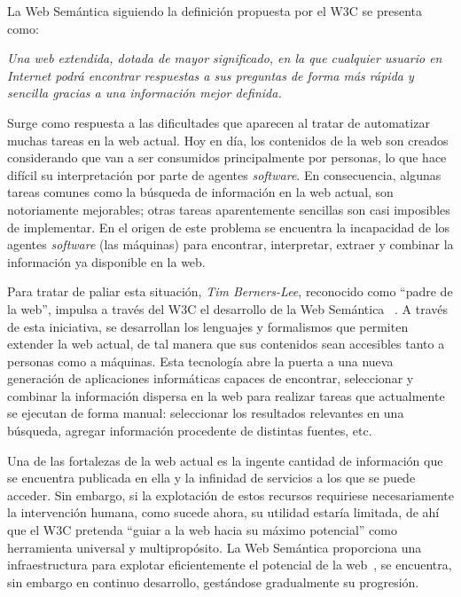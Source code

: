La Web Semántica siguiendo la definición propuesta por el W3C se presenta como: 
\begin{Frame}
\textit{Una web extendida, dotada de mayor significado, en la que cualquier
usuario en Internet podrá encontrar respuestas a sus preguntas de forma más rápida y
sencilla gracias a una información mejor definida.}
\end{Frame}

Surge como respuesta a las dificultades que aparecen al tratar de 
automatizar muchas tareas en la web actual. Hoy en día, los contenidos de la web son
creados considerando que van a ser consumidos principalmente por personas,
lo que hace difícil su interpretación por parte de agentes \textit{software}.
En consecuencia, algunas tareas comunes como la búsqueda de información en la web actual,
son notoriamente mejorables; otras tareas aparentemente sencillas son casi imposibles de implementar.
En el origen de este problema se encuentra la incapacidad de los agentes \textit{software} (las máquinas)
para encontrar, interpretar, extraer y combinar la información ya disponible en la web.


Para tratar de paliar esta situación, \textit{Tim Berners-Lee}, reconocido como ``padre de la web'',
impulsa a través del \gls{W3C} el desarrollo de la Web Semántica ~\cite{WeavingTim,berners-lee06a}.
A través de esta iniciativa, se desarrollan los lenguajes y formalismos que permiten
extender la web actual, de tal manera que sus contenidos sean accesibles tanto a
personas como a máquinas. Esta tecnología abre la puerta a una nueva generación
de aplicaciones informáticas capaces de encontrar, seleccionar y combinar la
información dispersa en la web para realizar tareas que actualmente se ejecutan de forma manual: seleccionar los resultados relevantes en una búsqueda, agregar
información procedente de distintas fuentes, etc.


Una de las fortalezas de la web actual es la ingente cantidad de información que se encuentra
publicada en ella y la infinidad de servicios a los que se puede acceder.
Sin embargo, si la explotación de estos recursos requiriese necesariamente la intervención humana,
como sucede ahora, su utilidad estaría limitada, de ahí que el W3C pretenda
``guiar a la web hacia su máximo potencial'' como herramienta universal y multipropósito.
La Web Semántica proporciona una infraestructura para explotar eficientemente el potencial de
la web~\cite{Berendt02,decker00knowledge}, se encuentra, sin embargo en continuo desarrollo, gestándose gradualmente su progresión.

